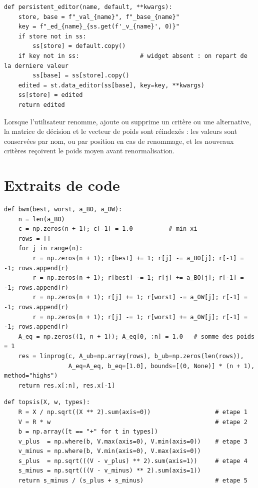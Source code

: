 \documentclass[11pt,a4paper]{report}
\theoremstyle{definition}
\theoremstyle{remark}
\begin{document}
\begin{lstlisting}[caption={Editeur persistant (ui/common.py)}]
def persistent_editor(name, default, **kwargs):
    store, base = f"_val_{name}", f"_base_{name}"
    key = f"_ed_{name}_{ss.get(f'_v_{name}', 0)}"
    if store not in ss:
        ss[store] = default.copy()
    if key not in ss:                 # widget absent : on repart de la derniere valeur
        ss[base] = ss[store].copy()
    edited = st.data_editor(ss[base], key=key, **kwargs)
    ss[store] = edited
    return edited
\end{lstlisting}

Lorsque l'utilisateur renomme, ajoute ou supprime un critère ou une alternative, la matrice de décision et
le vecteur de poids sont réindexés : les valeurs sont conservées par nom, ou par position en cas de
renommage, et les nouveaux critères reçoivent le poids moyen avant renormalisation.

\section{Extraits de code}

\begin{lstlisting}[caption={BWM lineaire : construction de A x <= b et resolution (core/weighting.py)}]
def bwm(best, worst, a_BO, a_OW):
    n = len(a_BO)
    c = np.zeros(n + 1); c[-1] = 1.0          # min xi
    rows = []
    for j in range(n):
        r = np.zeros(n + 1); r[best] += 1; r[j] -= a_BO[j]; r[-1] = -1; rows.append(r)
        r = np.zeros(n + 1); r[best] -= 1; r[j] += a_BO[j]; r[-1] = -1; rows.append(r)
        r = np.zeros(n + 1); r[j] += 1; r[worst] -= a_OW[j]; r[-1] = -1; rows.append(r)
        r = np.zeros(n + 1); r[j] -= 1; r[worst] += a_OW[j]; r[-1] = -1; rows.append(r)
    A_eq = np.zeros((1, n + 1)); A_eq[0, :n] = 1.0   # somme des poids = 1
    res = linprog(c, A_ub=np.array(rows), b_ub=np.zeros(len(rows)),
                  A_eq=A_eq, b_eq=[1.0], bounds=[(0, None)] * (n + 1), method="highs")
    return res.x[:n], res.x[-1]
\end{lstlisting}

\begin{lstlisting}[caption={TOPSIS (core/crisp\_ranking.py, version simplifiee)}]
def topsis(X, w, types):
    R = X / np.sqrt((X ** 2).sum(axis=0))                  # etape 1
    V = R * w                                              # etape 2
    b = np.array([t == "+" for t in types])
    v_plus  = np.where(b, V.max(axis=0), V.min(axis=0))    # etape 3
    v_minus = np.where(b, V.min(axis=0), V.max(axis=0))
    s_plus  = np.sqrt(((V - v_plus) ** 2).sum(axis=1))     # etape 4
    s_minus = np.sqrt(((V - v_minus) ** 2).sum(axis=1))
    return s_minus / (s_plus + s_minus)                    # etape 5
\end{lstlisting}
\end{document}
